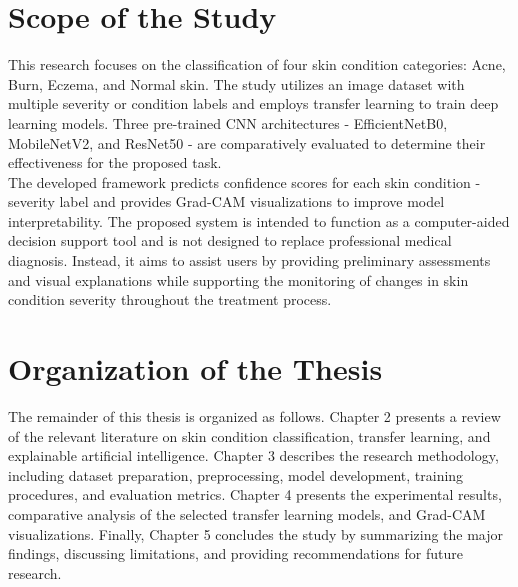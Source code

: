 \section{Scope of the Study}
This research focuses on the classification of four skin condition categories: Acne, Burn, Eczema, and Normal skin. The study utilizes an image dataset with multiple severity or condition labels and employs transfer learning to train deep learning models. Three pre-trained CNN architectures - EfficientNetB0, MobileNetV2, and ResNet50 - are comparatively evaluated to determine their effectiveness for the proposed task.\\
The developed framework predicts confidence scores for each skin condition - severity label and provides Grad-CAM visualizations to improve model interpretability. The proposed system is intended to function as a computer-aided decision support tool and is not designed to replace professional medical diagnosis. Instead, it aims to assist users by providing preliminary assessments and visual explanations while supporting the monitoring of changes in skin condition severity throughout the treatment process.

\section{Organization of the Thesis}
The remainder of this thesis is organized as follows. Chapter 2 presents a review of the relevant literature on skin condition classification, transfer learning, and explainable artificial intelligence. Chapter 3 describes the research methodology, including dataset preparation, preprocessing, model development, training procedures, and evaluation metrics. Chapter 4 presents the experimental results, comparative analysis of the selected transfer learning models, and Grad-CAM visualizations. Finally, Chapter 5 concludes the study by summarizing the major findings, discussing limitations, and providing recommendations for future research.



